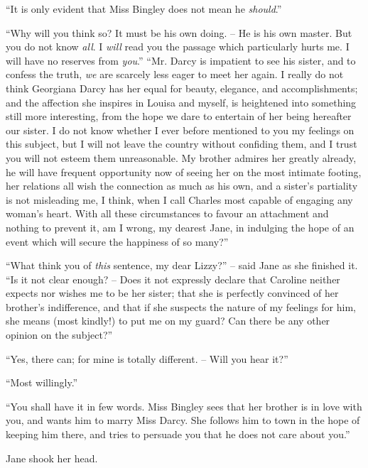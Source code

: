 “It is only evident that Miss Bingley does not mean
he \textit{should}.”

“Why will you think so? It must be his own doing. -- He
is his own master. But you do not know \textit{all}. I \textit{will}
read you the passage which particularly hurts me. I will
have no reserves from \textit{you}.” “Mr. Darcy is impatient
to see his sister, and to confess the truth, \textit{we} are
scarcely less eager to meet her again. I really do
not think Georgiana Darcy has her equal for beauty,
elegance, and accomplishments; and the affection she
inspires in Louisa and myself, is heightened into something
still more interesting, from the hope we dare to
entertain of her being hereafter our sister. I do not
know whether I ever before mentioned to you my
feelings on this subject, but I will not leave the country
without confiding them, and I trust you will not esteem
them unreasonable. My brother admires her greatly
already, he will have frequent opportunity now of seeing
her on the most intimate footing, her relations all wish
the connection as much as his own, and a sister’s partiality
is not misleading me, I think, when I call Charles most
capable of engaging any woman’s heart. With all these
circumstances to favour an attachment and nothing to prevent
it, am I wrong, my dearest Jane, in indulging the hope
of an event which will secure the happiness of so many?”

“What think you of \textit{this} sentence, my dear Lizzy?” -- said
Jane as she finished it. “Is it not clear enough? -- Does
it not expressly declare that Caroline neither expects
nor wishes me to be her sister; that she is perfectly convinced
of her brother’s indifference, and that if she suspects
the nature of my feelings for him, she means (most kindly!)
to put me on my guard? Can there be any other opinion
on the subject?”

“Yes, there can; for mine is totally different. -- Will
you hear it?”

“Most willingly.”

“You shall have it in few words. Miss Bingley sees
that her brother is in love with you, and wants him to
marry Miss Darcy. She follows him to town in the hope
of keeping him there, and tries to persuade you that he
does not care about you.”

Jane shook her head.

